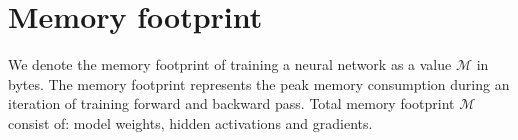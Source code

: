 \documentclass[10pt,twocolumn,letterpaper]{article}
\begin{document}
%	
%	
%



\section{Memory footprint}
We denote the memory footprint of training a neural network as a value $\mathcal{M}$ in bytes. The memory footprint represents the peak memory consumption during an iteration of training forward and backward pass. Total memory footprint  $\mathcal{M}$ consist of:  model weights, hidden activations and gradients.
    
\end{document}
